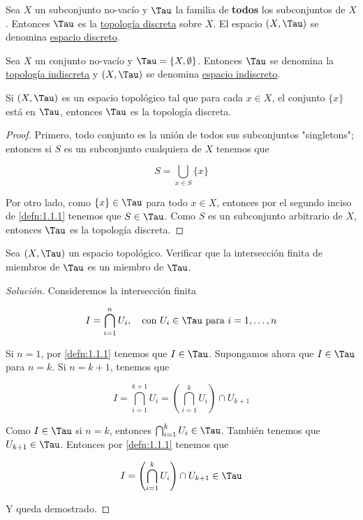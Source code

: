 \begin{defn}
    Sea $X$ un subconjunto no-vacío y $\Tau$ la familia de \textbf{todos} los subconjuntos de $X$. Entonces $\Tau$ es la \ul{topología discreta} sobre $X$. El espacio $(X, \Tau)$ se denomina \ul{espacio discreto}.
\end{defn}

\begin{defn}
    Sea $X$ un conjunto no-vacío y $\Tau = \{X, \emptyset\}$. Entonces $\Tau$ se denomina la \ul{topología indiscreta} y $(X, \Tau)$ se denomina \ul{espacio indiscreto}.
\end{defn}

\begin{pro}
    Si $(X, \Tau)$ es un espacio topológico tal que para cada $x \in X$, el conjunto $\{x\}$ está en $\Tau$, entonces $\Tau$ es la topología discreta.
\end{pro}

\begin{proof}
    Primero, todo conjunto es la unión de todos sus subconjuntos "singletons"; entonces si $S$ es un subconjunto cualquiera de $X$ tenemos que
    
    \[
    S = \bigcup_{x \in S} \{x\}
    \]
    
    Por otro lado, como $\{x\} \in \Tau$ para todo $x \in X$, entonces por el segundo inciso de \ref{defn:1.1.1} tenemos que $S \in \Tau$. Como $S$ es un subconjunto arbitrario de $X$, entonces $\Tau$ es la topología discreta.
\end{proof}

\begin{ejer}
    Sea $(X, \Tau)$ un espacio topológico. Verificar que la intersección finita de miembros de $\Tau$ es un miembro de $\Tau$.
\end{ejer}

\begin{proof}[Solución]
    Consideremos la intersección finita
    
    \[
    I = \bigcap_{i = 1}^n U_i, \quad \text{con $U_i \in \Tau$ para $i = 1, \dots, n$}
    \]
    
    Si $n=1$, por \ref{defn:1.1.1} tenemos que $I \in \Tau$. Supongamos ahora que $I \in \Tau$ para $n = k$. Si $n = k+1$, tenemos que
    
    \[
    I = \bigcap_{i = 1}^{k+1} U_i = \left( \bigcap_{i=1}^k U_i \right) \cap U_{k+1}
    \]
    
    Como $I \in \Tau$ si $n=k$, entonces $\bigcap_{i=1}^k U_i \in \Tau$. También tenemos que $U_{k+1} \in \Tau$. Entonces por \ref{defn:1.1.1} tenemos que
    
    \[
    I = \left( \bigcap_{i=1}^k U_i \right) \cap U_{k+1} \in \Tau
    \]
    
    Y queda demostrado.
\end{proof}

